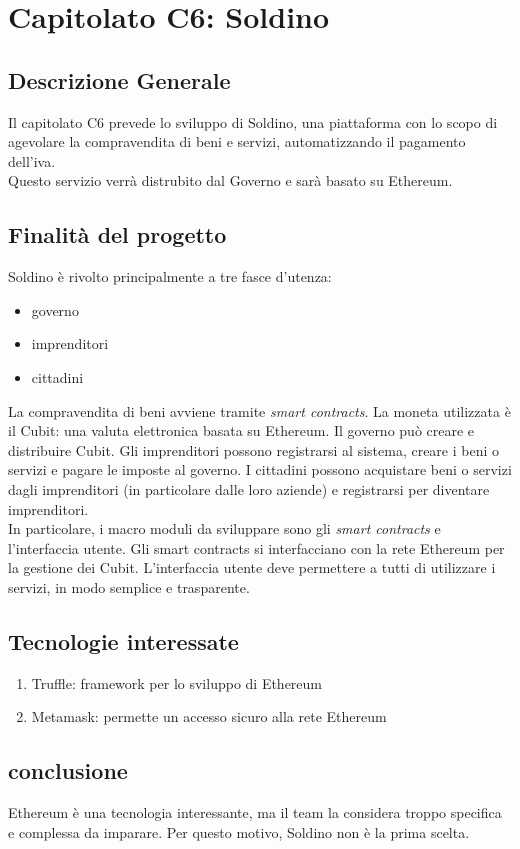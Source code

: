 \chapter{Capitolato C6: Soldino}
\section{Descrizione Generale}

Il capitolato C6 prevede lo sviluppo di Soldino, una piattaforma con lo scopo di agevolare la compravendita di beni e servizi, automatizzando il pagamento dell'iva.\\
Questo servizio verrà distrubito dal Governo e sarà basato su Ethereum. 


\section{Finalit\`a del progetto}
Soldino è rivolto principalmente a tre fasce d'utenza:
\begin{itemize}
	\item governo
	\item imprenditori
	\item cittadini
\end{itemize}
La compravendita di beni avviene tramite \textit{smart contracts}. La moneta utilizzata è il Cubit: una valuta elettronica basata su Ethereum.
Il governo può creare e distribuire Cubit. Gli imprenditori possono registrarsi al sistema, creare i beni o servizi e pagare le imposte al governo. I cittadini possono acquistare beni o servizi dagli imprenditori (in particolare dalle loro aziende) e registrarsi per diventare imprenditori.\\
In particolare, i macro moduli da sviluppare sono gli \textit{smart contracts} e l'interfaccia utente. Gli smart contracts si interfacciano con la rete Ethereum per la gestione dei Cubit. L'interfaccia utente deve permettere a tutti di utilizzare i servizi, in modo semplice e trasparente.


\section{Tecnologie interessate}
\begin{enumerate}
	\item Truffle: framework per lo sviluppo di Ethereum
	\item Metamask: permette un accesso sicuro alla rete Ethereum
\end{enumerate}
\section{conclusione}
Ethereum è una tecnologia interessante, ma il team la considera troppo specifica e complessa da imparare. Per questo motivo, Soldino non è la prima scelta. 